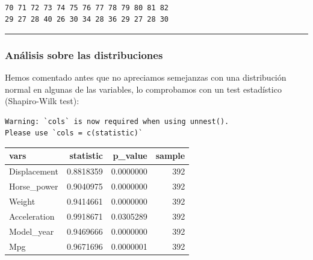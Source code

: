 \documentclass[
]{article}
\newenvironment{Shaded}{\begin{snugshade}}{\end{snugshade}}
\newcommand{\FloatTok}[1]{\textcolor[rgb]{0.00,0.00,0.81}{#1}}
\newcommand{\KeywordTok}[1]{\textcolor[rgb]{0.13,0.29,0.53}{\textbf{#1}}}
\newcommand{\NormalTok}[1]{#1}
\newcommand{\OperatorTok}[1]{\textcolor[rgb]{0.81,0.36,0.00}{\textbf{#1}}}
\newcommand{\StringTok}[1]{\textcolor[rgb]{0.31,0.60,0.02}{#1}}
\begin{document}
\begin{Shaded}
\end{Shaded}

\begin{verbatim}

70 71 72 73 74 75 76 77 78 79 80 81 82 
29 27 28 40 26 30 34 28 36 29 27 28 30 
\end{verbatim}

\begin{center}\rule{0.5\linewidth}{0.5pt}\end{center}

\hypertarget{anuxe1lisis-sobre-las-distribuciones}{%
\subsubsection{Análisis sobre las
distribuciones}\label{anuxe1lisis-sobre-las-distribuciones}}

Hemos comentado antes que no apreciamos semejanzas con una distribución
normal en algunas de las variables, lo comprobamos con un test
estadístico (Shapiro-Wilk test):

\begin{Shaded}
\end{Shaded}

\begin{verbatim}
Warning: `cols` is now required when using unnest().
Please use `cols = c(statistic)`
\end{verbatim}

\begin{tabular}{l|r|r|r}
\hline
vars & statistic & p\_value & sample\\
\hline
Displacement & 0.8818359 & 0.0000000 & 392\\
\hline
Horse\_power & 0.9040975 & 0.0000000 & 392\\
\hline
Weight & 0.9414661 & 0.0000000 & 392\\
\hline
Acceleration & 0.9918671 & 0.0305289 & 392\\
\hline
Model\_year & 0.9469666 & 0.0000000 & 392\\
\hline
Mpg & 0.9671696 & 0.0000001 & 392\\
\hline
\end{tabular}
\end{document}
